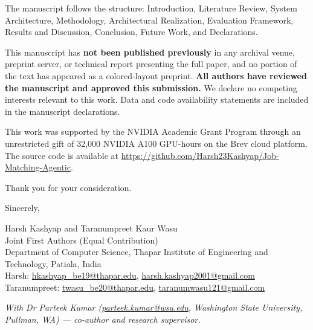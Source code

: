 \documentclass[11pt,a4paper]{article}
\begin{document}
The manuscript follows the structure: Introduction, Literature Review, System Architecture, Methodology, Architectural Realization, Evaluation Framework, Results and Discussion, Conclusion, Future Work, and Declarations.

This manuscript has \textbf{not been published previously} in any archival venue, preprint server, or technical report presenting the full paper, and no portion of the text has appeared as a colored-layout preprint. \textbf{All authors have reviewed the manuscript and approved this submission.} We declare no competing interests relevant to this work. Data and code availability statements are included in the manuscript declarations.

This work was supported by the NVIDIA Academic Grant Program through an unrestricted gift of 32,000 NVIDIA A100 GPU-hours on the Brev cloud platform. The source code is available at \url{https://github.com/Harsh23Kashyap/Job-Matching-Agentic}.

Thank you for your consideration.

\vspace{1.5em}

\noindent Sincerely,

\vspace{2em}

\noindent Harsh Kashyap and Taranumpreet Kaur Wasu\\
Joint First Authors (Equal Contribution)\\
Department of Computer Science, Thapar Institute of Engineering and Technology, Patiala, India\\
Harsh: \url{hkashyap_be19@thapar.edu}, \url{harsh.kashyap2001@gmail.com}\\
Taranumpreet: \url{twasu_be20@thapar.edu}, \url{taranumwasu121@gmail.com}

\vspace{0.8em}

\noindent\textit{With Dr Parteek Kumar (\url{parteek.kumar@wsu.edu}, Washington State University, Pullman, WA) --- co-author and research supervisor.}
\end{document}
